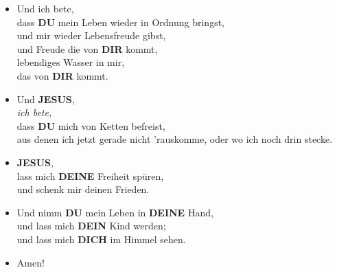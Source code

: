 \documentclass[10pt,a5paper]{article}
\newcommand{\Deine}[0]{\textbf{DEINE}}
\newcommand{\Dein}[0]{\textbf{DEIN}}
\newcommand{\Dich}[0]{\textbf{DICH}}
\newcommand{\Dir}[0]{\textbf{DIR}}
\newcommand{\Du}[0]{\textbf{DU}}
\newcommand{\Jesus}[0]{\textbf{JESUS}}
\begin{document}
\begin{itemize}[nosep]
					\\
					und f\"ur {\Dein} Reich am besten ist.
			\item	Und ich bete,
					\\
					dass {\Du} mein Leben wieder in Ordnung bringst,
					\\
					und mir wieder Lebensfreude gibst,
					\\
					und Freude die von {\Dir} kommt,
					\\
					lebendiges Wasser in mir,
					\\
					das von {\Dir} kommt.
			\item	Und {\Jesus},
					\\
					\textit{ich bete,}
					\\
					dass {\Du} mich von Ketten befreist,
					\\
					aus denen ich jetzt gerade nicht 'rauskomme,
					oder wo ich noch drin stecke.
			\item	{\Jesus},
					\\
					lass mich {\Deine} Freiheit spüren,
					\\
					und schenk mir deinen Frieden.
			\item	Und nimm {\Du} mein Leben in {\Deine} Hand,
					\\
					und lass mich {\Dein} Kind werden;
					\\
					und lass mich {\Dich} im Himmel sehen.
			\item	Amen!
		\end{itemize}
\end{document}
